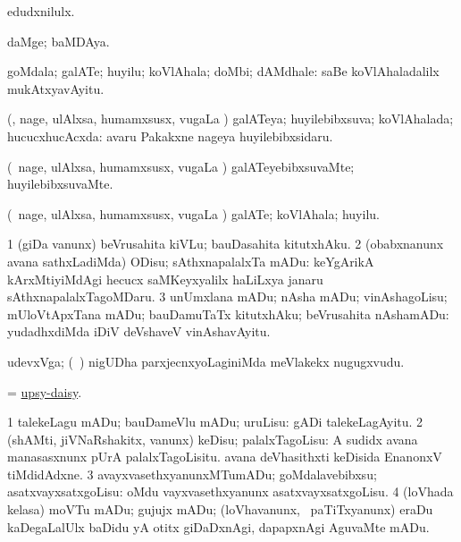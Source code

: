 \bentry
{} 
\gl{\akirx}
\bmng
edudxnilulx. 
\emng
\eentry

\bentry
{} 
\gl{\nA}
\expl{}
\bmng
daMge; baMDAya. 
\emng
\eentry

\bentry
{} 
\gl{\nA}
\expl{}
\bmng
goMdala; galATe; huyilu; koVlAhala; doMbi; dAMdhale:  saBe koVlAhaladalilx mukAtxyavAyitu. 
\emng
\eentry

\bentry
{} 
\gl{\nA}
\expl{}
\bmng
(\kanmu, nage, ulAlxsa, humamxsusx, \mo vugaLa \vi) galATeya; huyilebibxsuva; koVlAhalada; hucucxhucAcxda:  avaru Pakakxne nageya huyilebibxsidaru. 
\emng
\eentry

\bentry
{} 
\gl{\kirxvi}
\expl{}
\bmng
(\kanmu\ nage, ulAlxsa, humamxsusx, \mo vugaLa \vi) galATeyebibxsuvaMte; huyilebibxsuvaMte. 
\emng
\eentry

\bentry
{} 
\gl{\nA}
\expl{}
\bmng
(\kanmu\ nage, ulAlxsa, humamxsusx, \mo vugaLa \vi) galATe; koVlAhala; huyilu. 
\emng
\eentry

\bentry
{} 
\gl{\sakirx}
\expl{}
\bmng
\bnum
\num{1} (giDa \mo vanunx) beVrusahita kiVLu; bauDasahita kitutxhAku. 
\num{2} (obabxnanunx avana sathxLadiMda) ODisu; sAthxnapalalxTa mADu:  keYgArikA kArxMtiyiMdAgi hecucx saMKeyxyalilx haLiLxya janaru sAthxnapalalxTagoMDaru. 
\num{3} unUmxlana mADu; nAsha mADu; vinAshagoLisu; mUloVtApxTana mADu; bauDamuTaTx kitutxhAku; beVrusahita nAshamADu:  yudadhxdiMda iDiV deVshaveV vinAshavAyitu. 
\enum
\emng
\eentry

\bentry
{} 
\gl{\nA}
\expl{}
\bmng
udevxVga; (\kanmu\ \mavi) nigUDha parxjecnxyoLaginiMda meVlakekx nugugxvudu. 
\emng
\eentry

\bentry
{} 
\gl{\BAavayx}
\expl{}
\bmng
= \hyperlink{upsy-daisy}{upsy-daisy}. 
\emng
\eentry

\bentry
{} 
\gl{\kirx}


\noindent
\gl{\sakirx}
\bmng
\bnum
\num{1} talekeLagu mADu; bauDameVlu mADu; uruLisu:  gADi talekeLagAyitu. 
\num{2} (shAMti, jiVNaRshakitx, \mo vanunx) keDisu; palalxTagoLisu:  A sudidx avana manasasxnunx pUrA palalxTagoLisitu.  avana deVhasithxti keDisida EnanonxV tiMdidAdxne. 
\num{3} avayxvasethxyanunxMTumADu; goMdalavebibxsu; asatxvayxsatxgoLisu:  oMdu vayxvasethxyanunx asatxvayxsatxgoLisu. 
\num{4} (loVhada kelasa) moVTu mADu; gujujx mADu; (loVhavanunx, \kanmu\ paTiTxyanunx) eraDu kaDegaLalUlx baDidu yA otitx giDaDxnAgi, dapapxnAgi AguvaMte mADu. 
\enum
\emng

